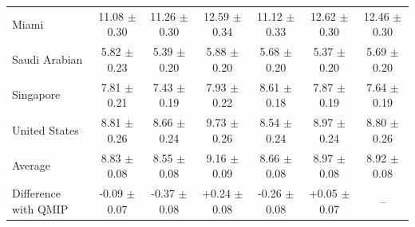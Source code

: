\begin{tabular}{lcccccc}
Miami & 11.08 $\pm$ 0.30 & 11.26 $\pm$ 0.30 & 12.59 $\pm$ 0.34 & 11.12 $\pm$ 0.33 & 12.62 $\pm$ 0.30 & 12.46 $\pm$ 0.30 \\
Saudi Arabian & 5.82 $\pm$ 0.23 & 5.39 $\pm$ 0.20 & 5.88 $\pm$ 0.20 & 5.68 $\pm$ 0.20 & 5.37 $\pm$ 0.20 & 5.69 $\pm$ 0.20 \\
Singapore & 7.81 $\pm$ 0.21 & 7.43 $\pm$ 0.19 & 7.93 $\pm$ 0.22 & 8.61 $\pm$ 0.18 & 7.87 $\pm$ 0.19 & 7.64 $\pm$ 0.19 \\
United States & 8.81 $\pm$ 0.26 & 8.66 $\pm$ 0.24 & 9.73 $\pm$ 0.26 & 8.54 $\pm$ 0.24 & 8.97 $\pm$ 0.24 & 8.80 $\pm$ 0.26 \\
\midrule
Average & 8.83 $\pm$ 0.08 & 8.55 $\pm$ 0.08 & 9.16 $\pm$ 0.09 & 8.66 $\pm$ 0.08 & 8.97 $\pm$ 0.08 & 8.92 $\pm$ 0.08 \\
Difference with QMIP & -0.09 $\pm$ 0.07 & -0.37 $\pm$ 0.08 & +0.24 $\pm$ 0.08 & -0.26 $\pm$ 0.08 & +0.05 $\pm$ 0.07 & -- \\
\bottomrule
\end{tabular}
